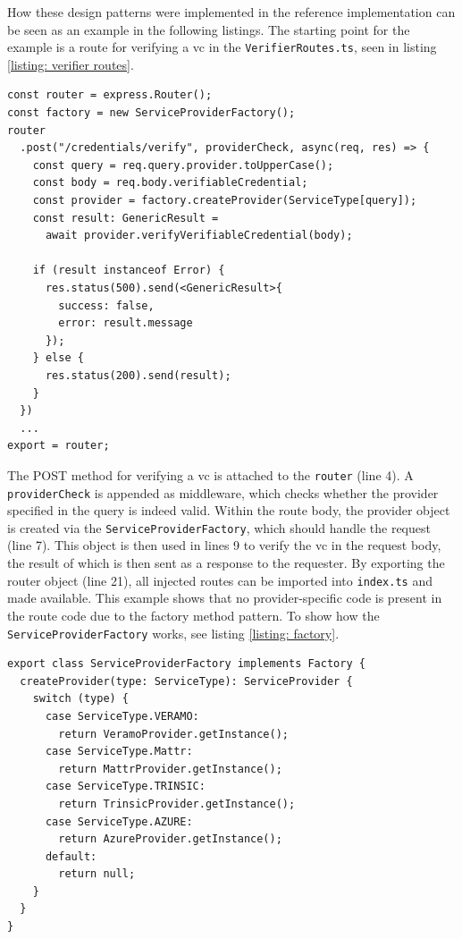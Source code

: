     How these design patterns were implemented in the reference implementation can be seen as an example in the following listings. The starting point for the example is a route for verifying a \ac{vc} in the \texttt{VerifierRoutes.ts}, seen in listing \ref{listing: verifier routes}.
    \newline

    \begin{lstlisting}[style=ES6, caption=Extract of verifier routes, label={listing: verifier routes}]
const router = express.Router();
const factory = new ServiceProviderFactory();
router
  .post("/credentials/verify", providerCheck, async(req, res) => {
    const query = req.query.provider.toUpperCase();
    const body = req.body.verifiableCredential;
    const provider = factory.createProvider(ServiceType[query]);
    const result: GenericResult =
      await provider.verifyVerifiableCredential(body);
      
    if (result instanceof Error) {
      res.status(500).send(<GenericResult>{ 
        success: false, 
        error: result.message 
      });
    } else {
      res.status(200).send(result);
    }
  })
  ...
export = router;
\end{lstlisting}

    The POST method for verifying a \ac{vc} is attached to the \texttt{router} (line 4). A \texttt{providerCheck} is appended as middleware, which checks whether the provider specified in the query is indeed valid. Within the route body, the provider object is created via the \texttt{ServiceProviderFactory}, which should handle the request (line 7). This object is then used in lines 9 to verify the \ac{vc} in the request body, the result of which is then sent as a response to the requester. By exporting the router object (line 21), all injected routes can be imported into \texttt{index.ts} and made available. This example shows that no provider-specific code is present in the route code due to the factory method pattern. To show how the \texttt{ServiceProviderFactory} works, see listing \ref{listing: factory}.
    \newline
    
    \begin{lstlisting}[style=ES6, caption=Extract of service provider factory, label={listing: factory}]
export class ServiceProviderFactory implements Factory {
  createProvider(type: ServiceType): ServiceProvider {
    switch (type) {
      case ServiceType.VERAMO:
        return VeramoProvider.getInstance();
      case ServiceType.Mattr:
        return MattrProvider.getInstance();
      case ServiceType.TRINSIC:
        return TrinsicProvider.getInstance();
      case ServiceType.AZURE:
        return AzureProvider.getInstance();
      default:
        return null;
    }
  }
}
\end{lstlisting}

